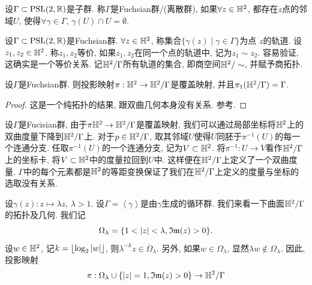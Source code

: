 \begin{definition}
    设$\Gamma \subset {\text{PSL}}(2,{\mathbb{R}})$是子群.  称$\Gamma$是Fuchsian群/(离散群), 如果$\forall z \in {\mathbb{H}^2}$, 都存在$z$点的邻域$U$, 使得$\forall \gamma \in \Gamma$, $\gamma(U) \cap U=\emptyset$.
\end{definition}
\begin{definition}
    设$\Gamma \subset {\text{PSL}}(2,{\mathbb{R}})$是Fuchsian群. $\forall z \in {\mathbb{H}^2}$, 称集合$\{\gamma(z)\mid \gamma \in \Gamma\}$为点 $z$的轨道. 设$z_1, z_2\in {\mathbb{H}^2}$. 称$z_1,z_2$等价,  如果$z_1,z_2$在同一个点的轨道中, 记为$z_1\sim z_2$. 容易验证, 这确实是一个等价关系.  记${\mathbb{H}^2}/\Gamma$所有轨道的集合, 即商空间${\mathbb{H}^2}/\sim $, 并赋予商拓扑.
\end{definition}
\begin{theorem}\label{covering}
    设$\Gamma$是Fuchsian群. 则投影映射$\pi: {\mathbb{H}^2} \to {\mathbb{H}^2}/\Gamma$是覆盖映射, 并且$\pi_1({\mathbb{H}^2}/\Gamma)=\Gamma$.
\end{theorem}
\begin{proof}
    这是一个纯拓扑的结果, 跟双曲几何本身没有关系. 参考\cite[定理81.5]{munkres}.
\end{proof}
\par 设$\Gamma$是Fucisian群, 由于$\pi {\mathbb{H}^2} \to {\mathbb{H}^2}/\Gamma$是覆盖映射, 我们可以通过局部坐标将${\mathbb{H}^2}$上的双曲度量下降到${\mathbb{H}^2}/\Gamma$上. 对于$p \in {\mathbb{H}^2}/\Gamma$, 取其邻域$U$使得$U$同胚于$\pi^{-1}(U)$的每一个连通分支.  任取$\pi^{-1}(U)$的一个连通分支, 记为$V\subset {\mathbb{H}^2}$. 将$\pi^{-1}: U \to V$看作${\mathbb{H}^2}/\Gamma$上的坐标卡, 将$V\subset {\mathbb{H}^2}$中的度量拉回到$U$中. 这样便在${\mathbb{H}^2}/\Gamma$上定义了一个双曲度量. $\Gamma$中的每个元素都是${\mathbb{H}^2}$的等距变换保证了我们在${\mathbb{H}^2}/\Gamma$上定义的度量与坐标的选取没有关系.
\par 设$\gamma(z): z\mapsto \lambda z$, $\lambda>1$.  设$\Gamma=\left<\gamma\right >$是由$\gamma$生成的循环群.  我们来看一下曲面${\mathbb{H}^2}/\Gamma$的拓扑及几何.  我们记
\begin{equation}
    \Omega_\lambda=\{1< {\left | z \right |}< \lambda, {\mathfrak{Im}}(z) >0\}.
\end{equation}
设$w \in {\mathbb{H}^2}$, 记$k={\lfloor {\log_2 {\left | w \right |}} \rfloor}$, 则$\lambda^{-k} z \in \overline{\Omega}_\lambda$. 另外, 如果$w \in \Omega_\lambda$, 显然$\lambda w \notin \Omega_\lambda$. 因此, 投影映射
\begin{equation}
    \pi: \Omega_\lambda \cup \{{\left | z \right |}=1, {\mathfrak{Im}}(z)>0\} \to {\mathbb{H}^2}/\Gamma
\end{equation}

